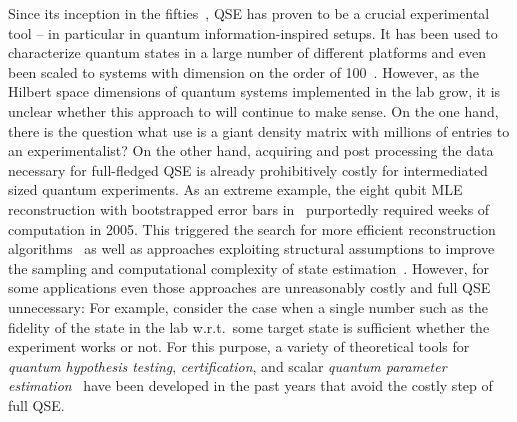 Since its inception in the fifties~\cite{Fano_1957_Description}, QSE has proven to be a crucial experimental tool -- in particular in quantum information-inspired setups.
It has been used to characterize quantum states in a large number of different platforms \cite{Brien_2004_Quantum,Lundeen_2009_Tomography,Terriza_2004_Triggered,Karpinski_2008_FiberOptic,Rippe_2008_Experimental,Steffen_2006_Measurement,Childress_2006_Coherent,Riebe_2007_Quantum,Schwemmer_2014_Experimental} and even been scaled to systems with dimension on the order of 100~\cite{Haeffner_2005_Scalable}.
However, as the Hilbert space dimensions of quantum systems implemented in the lab grow, it is unclear whether this approach to  will continue to make sense.
On the one hand, there is the question what use is a giant density matrix with millions of entries to an experimentalist?
On the other hand, acquiring and post processing the data necessary for full-fledged QSE is already prohibitively costly for intermediated sized quantum experiments.
As an extreme example, the eight qubit MLE reconstruction with bootstrapped error bars in~\cite{Haeffner_2005_Scalable} purportedly required weeks of computation in 2005.
This triggered the search for more efficient reconstruction algorithms~\cite{Smolin_2012_Maximum,Qi_2013_Quantum,Hou_2016_Full,Shang_2017_Superfast} as well as approaches exploiting structural assumptions to improve the sampling and computational complexity of state estimation~\cite{Cramer_2010_Efficient,Gross_2010_Quantum,Flammia_2012_Quantum,Schwemmer_2015_Systematic,Baumgratz_2013_Scalablea,Baumgratz_2013_Scalable}.
However, for some applications even those approaches are unreasonably costly and full QSE unnecessary:
For example, consider the case when a single number such as the fidelity of the state in the lab w.r.t.\ some target state is sufficient whether the experiment works  or not.
For this purpose, a variety of theoretical tools for \emph{quantum hypothesis testing}, \emph{certification}, and scalar \emph{quantum parameter estimation}~\cite{Donnell_2015_Quantum,Audenaert_2008_Asymptotic,Guehne_2009_Entanglement,Flammia_2011_Direct,Schwemmer_2015_Systematic,Li_2016_Optimal} have been developed in the past years that avoid the costly step of full QSE.

